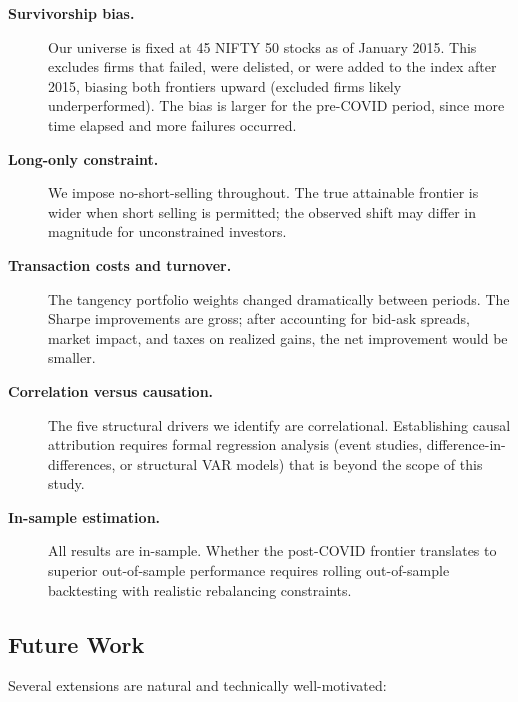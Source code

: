 \documentclass[12pt,a4paper]{article}
\begin{document}
\begin{description}
    \item[\textbf{Survivorship bias.}] Our universe is fixed at 45 NIFTY 50 stocks as
        of January 2015. This excludes firms that failed, were delisted, or were added
        to the index after 2015, biasing both frontiers upward (excluded firms likely
        underperformed). The bias is larger for the pre-COVID period, since more time
        elapsed and more failures occurred.
    \item[\textbf{Long-only constraint.}] We impose no-short-selling throughout. The
        true attainable frontier is wider when short selling is permitted; the observed
        shift may differ in magnitude for unconstrained investors.
    \item[\textbf{Transaction costs and turnover.}] The tangency portfolio weights
        changed dramatically between periods. The Sharpe improvements are gross; after
        accounting for bid-ask spreads, market impact, and taxes on realized gains, the
        net improvement would be smaller.
    \item[\textbf{Correlation versus causation.}] The five structural drivers we identify
        are correlational. Establishing causal attribution requires formal regression
        analysis (event studies, difference-in-differences, or structural VAR models)
        that is beyond the scope of this study.
    \item[\textbf{In-sample estimation.}] All results are in-sample. Whether the
        post-COVID frontier translates to superior out-of-sample performance requires
        rolling out-of-sample backtesting with realistic rebalancing constraints.
\end{description}

\subsection{Future Work}

Several extensions are natural and technically well-motivated:
\end{document}
